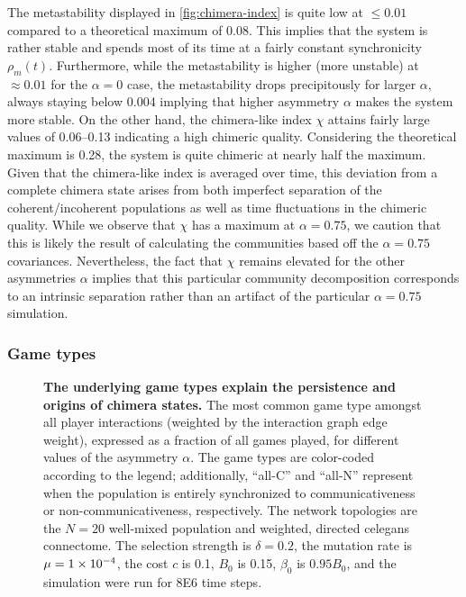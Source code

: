 \documentclass[pdflatex,lineno,referee,sn-nature]{sn-jnl}
\begin{document}
The metastability displayed in \cref{fig:chimera-index}
is quite low at $\le \num{0.01}$ compared
to a theoretical maximum of \num{0.08}.
This implies that the system is rather stable
and spends most of its time at a fairly constant
synchronicity $\rho_m(t)$.
Furthermore, while the metastability is higher (more unstable)
at $\approx \num{0.01}$ for the $\alpha = 0$ case,
the metastability drops precipitously for larger $\alpha$,
always staying below \num{0.004} implying that
higher asymmetry $\alpha$ makes the system more stable.
On the other hand, the chimera-like index $\chi$
attains fairly large values of \numrange{0.06}{0.13}
indicating a high chimeric quality.
Considering the theoretical maximum is \num{0.28},
the system is quite chimeric at nearly half the maximum.
Given that the chimera-like index is averaged over time,
this deviation from a complete chimera state
arises from both imperfect separation of the coherent/incoherent populations
as well as time fluctuations in the chimeric quality.
While we observe that $\chi$ has a maximum at $\alpha = \num{0.75}$,
we caution that this is likely the result of calculating the communities
based off the $\alpha = \num{0.75}$ covariances.
Nevertheless, the fact that $\chi$ remains elevated
for the other asymmetries $\alpha$
implies that this particular community decomposition
corresponds to an intrinsic separation rather than an artifact
of the particular $\alpha = \num{0.75}$ simulation.

\subsubsection{Game types}
\begin{figure}
  \centering
  \begin{subcaptiongroup}
      {\label{fig:game-type_celegans-full}\captiontext*{}}{%
      {\label{fig:game-type_well-mixed}\captiontext*{}}{%
    {}%
  }}
  \end{subcaptiongroup}
  \caption{
    \textbf{
      The underlying game types explain the persistence
      and origins of chimera states.
    }
    The most common game type amongst all player interactions
    (weighted by the interaction graph edge weight),
    expressed as a fraction of all games played,
    for different values of the asymmetry $\alpha$.
    The game types are color-coded according to the legend;
    additionally, ``all-C'' and ``all-N'' represent when the population
    is entirely synchronized to communicativeness or non-communicativeness, respectively.
    The network topologies are the
    $N=20$ well-mixed population
    and
    weighted, directed \gls{celegans} connectome.
    The selection strength is $\delta=0.2$,
    the mutation rate is $\mu=\num{1E-4}$,
    the cost $c$ is \num{0.1},
    $B_0$ is \num{0.15},
    $\beta_0$ is $\num{0.95} B_0$,
    and the simulation were run for \num{8E6} time steps.
  }
  \label{fig:game-type}
\end{figure}
\end{document}

